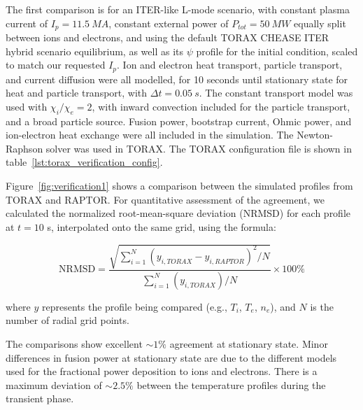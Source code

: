 \documentclass[aps, reprint, nofootinbib]{revtex4-2}
\begin{document}
The first comparison is for an ITER-like L-mode scenario, with constant plasma current of $I_p=11.5~MA$, constant external power of $P_{tot}=50~MW$ equally split between ions and electrons, and using the default TORAX CHEASE ITER hybrid scenario equilibrium, as well as its $\psi$ profile for the initial condition, scaled to match our requested $I_p$. Ion and electron heat transport, particle transport, and current diffusion were all modelled, for 10 seconds until stationary state for heat and particle transport, with $\Delta t=0.05~s$. The constant transport model was used with $\chi_i/\chi_e=2$, with inward convection included for the particle transport, and a broad particle source. Fusion power, bootstrap current, Ohmic power, and ion-electron heat exchange were all included in the simulation. The Newton-Raphson solver was used in TORAX. The TORAX configuration file is shown in table~\ref{lst:torax_verification_config}.

Figure~\ref{fig:verification1} shows a comparison between the simulated profiles from TORAX and RAPTOR. For quantitative assessment of the agreement, we calculated the normalized root-mean-square deviation (NRMSD) for each profile at $t = 10$ s, interpolated onto the same grid, using the formula:

\begin{equation}
\text{NRMSD} = \frac{\sqrt{\sum_{i=1}^{N} (y_{i,TORAX} - y_{i,RAPTOR})^2 / N}}{\sum_{i=1}^{N} (y_{i,TORAX})/N} \times 100\%
\end{equation}

where $y$ represents the profile being compared (e.g., $T_i$, $T_e$, $n_e$), and $N$ is the number of radial grid points.


The comparisons show excellent $\sim1\%$ agreement at stationary state. Minor differences in fusion power at stationary state are due to the different models used for the fractional power deposition to ions and electrons. There is a maximum deviation of $\sim2.5\%$ between the temperature profiles during the transient phase.


\end{document}

